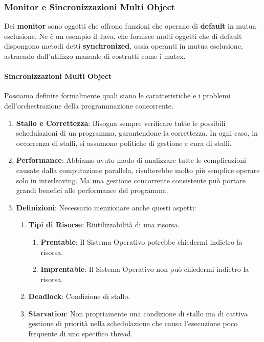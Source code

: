 \documentclass{article}
\begin{document}
\subsubsection{Monitor e Sincronizzazioni Multi Object}

Dei \textbf{monitor} sono oggetti che offrono funzioni che operano di \textbf{default} in mutua esclusione. Ne è un esempio il Java, che fornisce molti oggetti
che di default dispongono metodi detti \textbf{synchronized}, ossia operanti in mutua esclusione, astraendo dall'utilizzo manuale di costrutti come i mutex.

\paragraph{Sincronizzazioni Multi Object} Possiamo definire formalmente quali siano le caratteristiche e i problemi dell'orchestrazione della programmazione concorrente.

\begin{enumerate}
    \item \textbf{Stallo e Correttezza}: Bisogna sempre verificare tutte le possibili schedulazioni di un programma, garantendone la correttezza. In ogni caso, in occorrenza di stalli, si
    assumono politiche di gestione e cura di stalli.
    \item \textbf{Performance}: Abbiamo avuto modo di analizzare tutte le complicazioni causate dalla computazione parallela, risulterebbe molto più semplice operare solo in interleaving. Ma una gestione concorrente
    consistente può portare grandi benefici alle performance del programma.
\newpage
    \item \textbf{Definizioni}: Necessario menzionare anche questi aspetti:
    \begin{enumerate}
        \item \textbf{Tipi di Risorse}: Riutilizzabilità di una risorsa.
        \begin{enumerate}
            \item \textbf{Prentable}: Il Sistema Operativo potrebbe chiedermi indietro la risorsa.
            \item \textbf{Imprentable}: Il Sistema Operativo non può chiedermi indietro la risorsa.
        \end{enumerate}
        \item \textbf{Deadlock}: Condizione di stallo.
        \item \textbf{Starvation}: Non propriamente una condizione di stallo ma di cattiva gestione di priorità nella schedulazione che causa l'esecuzione
        poco frequente di uno specifico thread.
    \end{enumerate}
\end{enumerate}
\end{document}
